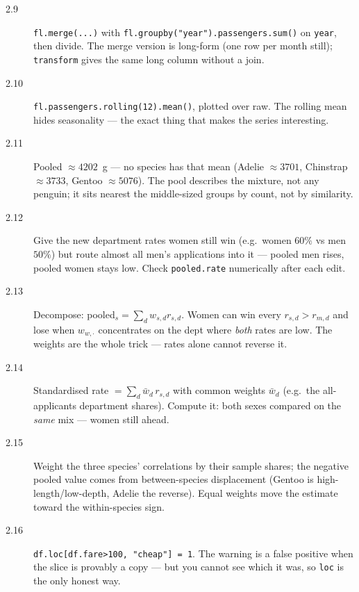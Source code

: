 \begin{description}
\item[2.9] \texttt{fl.merge(...)} with
  \texttt{fl.groupby("year").passengers.sum()} on \texttt{year}, then
  divide. The merge version is long-form (one row per month still);
  \texttt{transform} gives the same long column without a join.
\item[2.10] \texttt{fl.passengers.rolling(12).mean()}, plotted over raw.
  The rolling mean hides seasonality --- the exact thing that makes the
  series interesting.
\item[2.11] Pooled $\approx 4202$~g --- no species has that mean (Adelie
  $\approx 3701$, Chinstrap $\approx 3733$, Gentoo $\approx 5076$). The pool
  describes the mixture, not any penguin; it sits nearest the middle-sized
  groups by count, not by similarity.
\item[2.12] Give the new department rates women still win (e.g.\ women
  $60\%$ vs men $50\%$) but route almost all men's applications into it ---
  pooled men rises, pooled women stays low. Check
  \texttt{pooled.rate} numerically after each edit.
\item[2.13] Decompose: pooled$_s = \sum_d w_{s,d} r_{s,d}$. Women can win
  every $r_{s,d} > r_{m,d}$ and lose when $w_{w,\cdot}$ concentrates on the
  dept where \emph{both} rates are low. The weights are the whole trick ---
  rates alone cannot reverse it.
\item[2.14] Standardised rate $= \sum_d \bar w_d\, r_{s,d}$ with common
  weights $\bar w_d$ (e.g.\ the all-applicants department shares). Compute
  it: both sexes compared on the \emph{same} mix --- women still ahead.
\item[2.15] Weight the three species' correlations by their sample shares;
  the negative pooled value comes from between-species displacement
  (Gentoo is high-length/low-depth, Adelie the reverse). Equal weights move
  the estimate toward the within-species sign.
\item[2.16] \texttt{df.loc[df.fare>100, "cheap"] = 1}. The warning is a
  false positive when the slice is provably a copy --- but you cannot see
  which it was, so \texttt{loc} is the only honest way.
\end{description}
